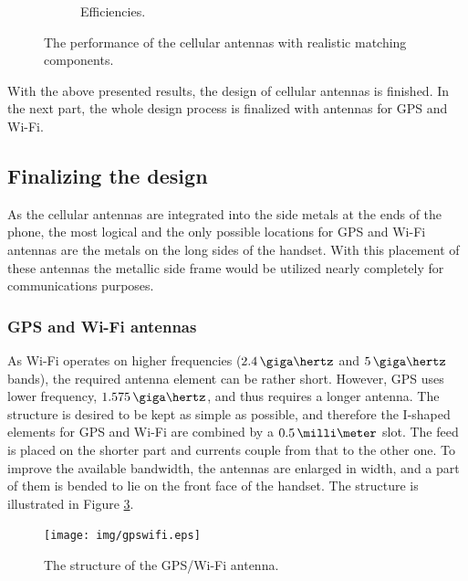 \begin{figure}[H]
\begin{subfigure}[b]{0.49\textwidth}
        \caption{Efficiencies.}
        \label{fig:div_eff_real}
    \end{subfigure}
    \caption{The performance of the cellular antennas with realistic matching components.}
    \label{fig:div_real}
    \vspace{-7pt}
\end{figure}

With the above presented results, the design of cellular antennas is finished. In the next part, the whole design process is finalized with antennas for GPS and Wi-Fi.

\vspace{-10pt}
\subsection{Finalizing the design}
\label{sec:sim_final}

As the cellular antennas are integrated into the side metals at the ends of the phone, the most logical and the only possible locations for GPS and Wi-Fi antennas are the metals on the long sides of the handset. With this placement of these antennas the metallic side frame would be utilized nearly completely for communications purposes.

\vspace{-8pt}
\subsubsection{GPS and Wi-Fi antennas}
\label{sec:gpswifi}
\vspace{-2pt}
As Wi-Fi operates on higher frequencies ($2.4\,\giga\hertz$ and $5\,\giga\hertz$ bands), the required antenna element can be rather short. However, GPS uses lower frequency, $1.575\,\giga\hertz$, and thus requires a longer antenna. The structure is desired to be kept as simple as possible, and therefore the I-shaped elements for GPS and Wi-Fi are combined by a $0.5\,\milli\meter$ slot. The feed is placed on the shorter part and currents couple from that to the other one. To improve the available bandwidth, the antennas are enlarged in width, and a part of them is bended to lie on the front face of the handset. The structure is illustrated in Figure \ref{fig:gps_struct}.
\begin{figure}[H]
    \centering
    \vspace{-10pt}
    \texttt{[image: img/gpswifi.eps]}
    \caption{The structure of the GPS/Wi-Fi antenna.}
    \label{fig:gps_struct}
    \vspace{-7pt}
\end{figure}

